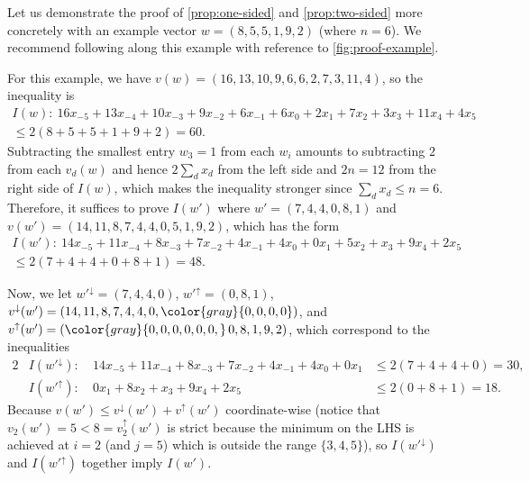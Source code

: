 \documentclass[letterpaper,reqno,11pt]{amsart}
\begin{document}
\begin{example}\label{proof-example}
    Let us demonstrate the proof of \cref{prop:one-sided} and \cref{prop:two-sided} more concretely with an example vector $w = (8, 5, 5, 1, 9, 2)$ (where $n = 6$). We recommend following along this example with reference to \cref{fig:proof-example}. 
    
    For this example, we have $v(w) = (16, 13, 10, 9, 6, 6, 2, 7, 3, 11, 4)$, so the inequality is 
    \begin{multline*}
        I(w):\ 16x_{-5}+13x_{-4}+10x_{-3}+9x_{-2}+6x_{-1}+6x_0+2x_{1}+7x_2+3x_3+11x_4+4x_5 \\ 
        \leq 2(8+5+5+1+9+2)=60.
    \end{multline*} 
    Subtracting the smallest entry $w_3 = 1$ from each $w_i$ amounts to subtracting $2$ from each $v_d(w)$ and hence $2\sum_{d}x_d$ from the left side and $2n = 12$ from the right side of $I(w)$, which makes the inequality stronger since $\sum_{d}x_d \leq n =6$. Therefore, it suffices to prove $I(w')$ where $w' = (7, 4, 4, 0, 8, 1)$ and $v(w') = (14, 11, 8, 7, 4, 4, 0, 5, 1, 9, 2)$, which has the form
    \begin{multline*}
        I(w'):\ 14x_{-5}+11x_{-4}+8x_{-3}+7x_{-2}+4x_{-1}+4x_0 + 0x_1 +5x_2+x_3+9x_4+2x_5 \\ 
        \leq 2(7+4+4+0+8+1)=48.
    \end{multline*} 

    Now, we let $w'^{\downarrow} = (7,4,4,0)$, $w'^{\uparrow} = (0, 8, 1)$, $v^{\downarrow}(w') = (14, 11, 8, 7, 4, 4, 0, {\color{gray}{0, 0, 0, 0}})$, and $v^{\uparrow}(w') = ({\color{gray}{0, 0, 0, 0, 0, 0,}}\, 0, 8, 1, 9, 2)$, which correspond to the inequalities \begin{alignat*}{2}
        &I(w'^{\downarrow}):\ & 14x_{-5}+11x_{-4}+8x_{-3}+7x_{-2}+4x_{-1}+4x_0+0x_1 &\leq 2(7+4+4+0)=30, \\
        &I(w'^{\uparrow}):& 0x_1+8x_2+x_3+9x_4+2x_5&\leq 2(0+8+1)=18.
    \end{alignat*}
    Because $v(w')\leq v^{\downarrow}(w') +v^{\uparrow}(w')$ coordinate-wise (notice that $v_2(w') = 5 < 8 = v_2^{\uparrow}(w')$ is strict because the minimum on the LHS is achieved at $i = 2$ (and $j=5$) which is outside the range $\{3,4,5\}$), so $I(w'^{\downarrow})$ and $I(w'^{\uparrow})$ together imply $I(w')$.


\end{example}
\end{document}
